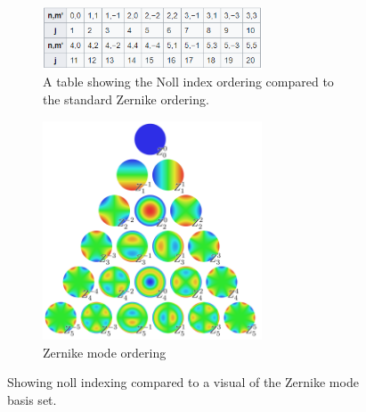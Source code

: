 \begin{figure}[H]
\centering
\begin{subfigure}{.5\textwidth}
  \centering
  \includegraphics[width=6.5cm]{Figures/noll_indexing.png}
  \caption{A table showing the Noll index ordering compared to the standard Zernike ordering\cite{Noll1976ZERNIKETURBULENCE.}.}
  \label{fig:noll_table}
\end{subfigure}%
\begin{subfigure}{.5\textwidth}
  \centering
  \includegraphics[width=6.5cm]{Figures/1024px-Zernike_polynomials2.png}
  \caption{Zernike mode ordering \cite{Noll1976ZERNIKETURBULENCE.}}
  \label{fig:Zernike}
\end{subfigure}
\caption{Showing noll indexing compared to a visual of the Zernike mode basis set.}
\label{fig:zerns}
\end{figure}

